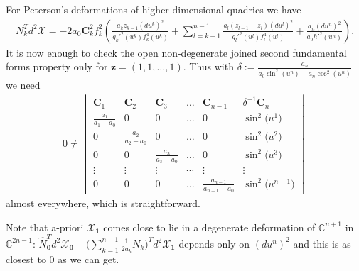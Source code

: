 For Peterson's deformations of higher dimensional quadrics we have
\begin{gather*}
N_k^Td^2\mathcal{X}=
-2a_0\mathbf{C}_k^2f_k^2\left(\frac{a_kz_{k-1}(du^k)^2}{g_k'^2(u^k)f_k^4(u^k)}
+\sum_{l=k+1}^{n-1}\frac{a_l(z_{l-1}-z_l)(du^l)^2}{g_l'^2(u^l)f_l^4(u^l)}
+\frac{a_n(du^n)^2}{a_0h'^2(u^n)}\right).
\end{gather*}
It is now enough to check the open non-degenerate joined second
fundamental forms property only for $\mathbf{z}=(1,1,\dots ,1)$. Thus
with $\delta:=\frac{a_n}{a_0\sin^2(u^n)+a_n\cos^2(u^n)}$ we need
\begin{gather*}
0\neq\begin{vmatrix}
\mathbf{C}_1&\mathbf{C}_2&\mathbf{C}_3&\dots &\mathbf{C}_{n-1}&\delta^{-1}\mathbf{C}_n\\
\frac{a_1}{a_1-a_0}&0&0&\dots &0&\sin^2\big(u^1\big)\\
0&\frac{a_2}{a_2-a_0}&0&\dots &0&\sin^2\big(u^2\big)\\
0&0&\frac{a_3}{a_3-a_0}&\dots &0&\sin^2\big(u^3\big)\\
\vdots&\vdots&\vdots&\cdots&\vdots&\vdots\\
0&0&0&\dots &\frac{a_{n-1}}{a_{n-1}-a_0}&\sin^2\big(u^{n-1}\big)\end{vmatrix}
\end{gather*}
almost everywhere, which is straightforward.

\begin{remark}
Note that a-priori $\mathcal{X}_{\mathbf{1}}$ comes close to lie
in a degenerate deformation of $\mathbb{C}^{n+1}$ in
$\mathbb{C}^{2n-1}$:  $\hat
N_{\mathbf{0}}^Td^2\mathcal{X}_{\mathbf{0}}-
\big(\sum\limits_{k=1}^{n-1}\frac{1}{2a_k}N_k\big)^Td^2\mathcal{X}_{\mathbf{1}}$
depends only on $(du^n)^2$ and this is as closest to $0$ as we can
get.
\end{remark}
